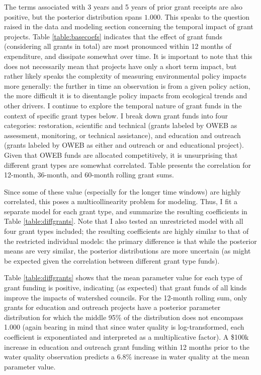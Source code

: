 \documentclass[11pt,a4paper,titlepage]{article}
\begin{document}
The terms associated with 3 years and 5 years of prior grant receipts are also positive, but the posterior distribution spans $1.000$. This speaks to the question raised in the data and modeling section concerning the temporal impact of grant projects. Table \ref{table:basecoefs} indicates that the effect of grant funds (considering all grants in total) are most pronounced within 12 months of expenditure, and dissipate somewhat over time. It is important to note that this does not necessarily mean that projects have only a short term impact, but rather likely speaks the complexity of measuring environmental policy impacts more generally: the further in time an observation is from a given policy action, the more difficult it is to disentangle policy impacts from ecological trends and other drivers. I continue to explore the temporal nature of grant funds in the context of specific grant types below. I break down grant funds into four categories: restoration, scientific and technical (grants labeled by OWEB as assessment, monitoring, or technical assistance), and education and outreach (grants labeled by OWEB as either and outreach or and educational project). Given that OWEB funds are allocated competitively, it is unsurprising that different grant types are somewhat correlated. Table presents the correlation for 12-month, 36-month, and 60-month rolling grant sums.



Since some of these value (especially for the longer time windows) are highly correlated, this poses a multicollinearity problem for modeling. Thus, I fit a separate model for each grant type, and summarize the resulting coefficients in Table \ref{table:diffgrants}. Note that I also tested an unrestricted model with all four grant types included; the resulting coefficients are highly similar to that of the restricted individual models: the primary difference is that while the posterior means are very similar, the posterior distributions are more uncertain (as might be expected given the correlation between different grant type funds). 



Table \ref{table:diffgrants} shows that the mean parameter value for each type of grant funding is positive, indicating (as expected) that grant funds of all kinds improve the impacts of watershed councils. For the 12-month rolling sum, only grants for education and outreach projects have a posterior parameter distribution for which the middle 95\% of the distribution does not encompass 1.000 (again bearing in mind that since water quality is log-transformed, each coefficient is exponentiated and interpreted as a multiplicative factor). A \$100k increase in education and outreach grant funding within 12 months prior to the water quality observation predicts a 6.8\% increase in water quality at the mean parameter value.
\end{document}
